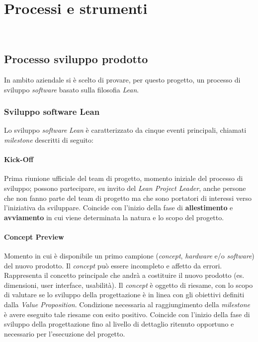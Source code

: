 
\chapter{Processi e strumenti}
\label{cap:processi-metodologie}

\\

\section{Processo sviluppo prodotto}
In ambito aziendale si è scelto di provare, per questo progetto, un processo di sviluppo \emph{software} basato sulla filosofia \emph{Lean}.\\

\subsection{Sviluppo software Lean}
Lo sviluppo \emph{software} \emph{Lean} è caratterizzato da cinque eventi principali, chiamati \emph{milestone} descritti di seguito:\\


\subsubsection{Kick-Off}
Prima riunione ufficiale del team di progetto, momento iniziale del processo di sviluppo; possono partecipare, su invito del \emph{Lean Project Leader}, anche persone che non fanno parte del team di progetto ma che sono portatori di interessi verso l'iniziativa da sviluppare. Coincide con l'inizio della fase di \textbf{allestimento} e \textbf{avviamento} in cui viene determinata la natura e lo scopo del progetto.\\

\subsubsection{Concept Preview}
Momento in cui è disponibile un primo campione (\emph{concept}, \emph{hardware} e/o \emph{software}) del nuovo prodotto. Il \emph{concept} può essere incompleto e affetto da errori. Rappresenta il concetto principale che andrà a costituire il nuovo prodotto (es. dimensioni, user interface, usabilità). Il \emph{concept} è oggetto di riesame, con lo scopo di valutare se lo sviluppo della progettazione è in linea con gli obiettivi definiti dalla \emph{Value Proposition}. Condizione necessaria al raggiungimento della \emph{milestone} è avere eseguito tale riesame con esito positivo. Coincide con l'inizio della fase di sviluppo della progettazione fino al livello di dettaglio ritenuto opportuno e necessario per l'esecuzione del progetto.\\

